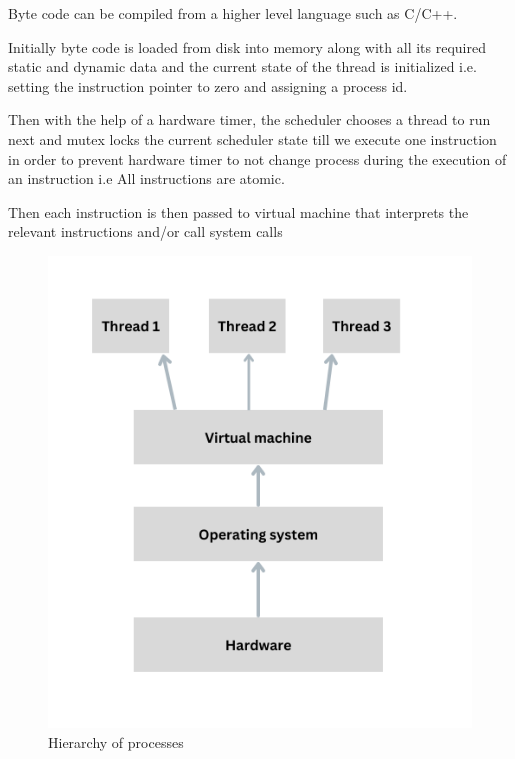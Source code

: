\documentclass[12pt]{report}
\begin{document}
    Byte code  can be compiled from a higher level language such as C/C++.

    Initially byte code is loaded from disk into memory along with all its required static and 
    dynamic data and the current state of the thread is initialized i.e. setting the instruction 
    pointer to zero and assigning a process id.

    Then with the help of a hardware timer, the scheduler chooses a thread to run next and 
    mutex locks the current scheduler state till we execute one instruction in order to 
    prevent hardware timer to not change process during the execution of an instruction 
    i.e All instructions are atomic.

    Then each instruction is then passed to virtual machine that interprets the relevant 
    instructions and/or call system calls


    \begin{figure}
    \begin{center}
    \includegraphics{images/hierarchy.png}
    \end{center}
    \caption{Hierarchy of processes}
    \label{fig:fig2}
    \end{figure}
\end{document}

